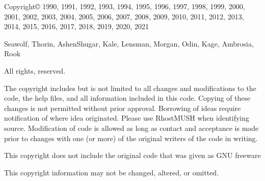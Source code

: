 \documentclass[letterpaper,10pt,english]{sphinxmanual}
\begin{document}
\sphinxAtStartPar
Copyright© 1990, 1991, 1992, 1993, 1994, 1995, 1996, 1997, 1998, 1999,
2000, 2001, 2002, 2003, 2004, 2005, 2006, 2007, 2008, 2009, 2010, 2011, 2012,
2013, 2014, 2015, 2016, 2017, 2018, 2019, 2020, 2021

\sphinxAtStartPar
Seawolf, Thorin, Ashen\sphinxhyphen{}Shugar, Kale, Lensman, Morgan, Odin, Kage, Ambrosia, Rook

\sphinxAtStartPar
All rights, reserved.

\sphinxAtStartPar
The copyright includes but is not limited to all changes and modifications to
the code, the help files, and all information included in this code.
Copying of these changes is not permitted without prior approval.
Borrowing of ideas require notification of where idea originated.
Please use \textquotesingle{}RhostMUSH\textquotesingle{} when identifying source. Modification of code is allowed
as long as contact and acceptance is made prior to changes with one (or more) of
the original writers of the code in writing.

\sphinxAtStartPar
This copyright does not include the original code that was given as GNU freeware

\sphinxAtStartPar
This copyright information may not be changed, altered, or omitted.



\renewcommand{\indexname}{Index}
\printindex
\end{document}

